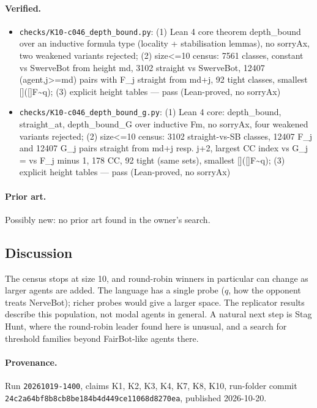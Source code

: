 \documentclass{article}
\begin{document}
\paragraph{Verified.}
\begin{itemize}
\item \texttt{checks/K10-c046\_depth\_bound.py}: (1) Lean 4 core theorem depth\_bound over an inductive formula type (locality + stabilisation lemmas), no sorryAx, two weakened variants rejected; (2) size\textless{}=10 census: 7561 classes, constant vs SwerveBot from height md, 3102 straight vs SwerveBot, 12407 (agent,j\textgreater{}=md) pairs with F\_j straight from md+j, 92 tight classes, smallest []([]F\textbar{}\textasciitilde{}q); (3) explicit height tables --- pass (Lean-proved, no sorryAx)
\item \texttt{checks/K10-c046\_depth\_bound\_g.py}: (1) Lean 4 core: depth\_bound, straight\_at, depth\_bound\_G over inductive Fm, no sorryAx, four weakened variants rejected; (2) size\textless{}=10 census: 3102 straight-vs-SB classes, 12407 F\_j and 12407 G\_j pairs straight from md+j resp. j+2, largest CC index vs G\_j = vs F\_j minus 1, 178 CC, 92 tight (same sets), smallest []([]F\textbar{}\textasciitilde{}q); (3) explicit height tables --- pass (Lean-proved, no sorryAx)
\end{itemize}

\paragraph{Prior art.} Possibly new: no prior art found in the owner's search.

\subsection*{Discussion}

The census stops at size 10, and round-robin winners in particular can change as larger agents
are added. The language has a single probe ($q$, how the opponent treats NerveBot); richer probes
would give a larger space. The replicator results describe this population, not modal agents in
general. A natural next step is Stag Hunt, where the round-robin leader found here is unusual, and
a search for threshold families beyond FairBot-like agents there.

\paragraph{Provenance.}
Run \texttt{20261019-1400}, claims K1, K2, K3, K4, K7, K8, K10, run-folder commit \texttt{24c2a64bf8b8cb8be184b4d449ce11068d8270ea}, published 2026-10-20.
\end{document}
